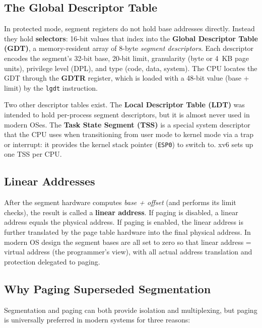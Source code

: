 \documentclass[11pt]{article}
\begin{document}
\subsection{The Global Descriptor Table}

In protected mode, segment registers do not hold base addresses directly. Instead they hold
\textbf{selectors}: 16-bit values that index into the \textbf{Global Descriptor Table
(GDT)}, a memory-resident array of 8-byte \emph{segment descriptors}. Each descriptor
encodes the segment's 32-bit base, 20-bit limit, granularity (byte or 4~KB page units),
privilege level (DPL), and type (code, data, system). The CPU locates the GDT through the
\textbf{GDTR} register, which is loaded with a 48-bit value (base + limit) by the
\texttt{lgdt} instruction.

Two other descriptor tables exist. The \textbf{Local Descriptor Table (LDT)} was intended
to hold per-process segment descriptors, but it is almost never used in modern OSes. The
\textbf{Task State Segment (TSS)} is a special system descriptor that the CPU uses when
transitioning from user mode to kernel mode via a trap or interrupt: it provides the kernel
stack pointer (\texttt{ESP0}) to switch to. xv6 sets up one TSS per CPU.

\subsection{Linear Addresses}

After the segment hardware computes \textit{base + offset} (and performs its limit checks),
the result is called a \textbf{linear address}. If paging is disabled, a linear address
equals the physical address. If paging is enabled, the linear address is further translated
by the page table hardware into the final physical address. In modern OS design the segment
bases are all set to zero so that linear address = virtual address (the programmer's view),
with all actual address translation and protection delegated to paging.

\subsection{Why Paging Superseded Segmentation}

Segmentation and paging can both provide isolation and multiplexing, but paging is
universally preferred in modern systems for three reasons:
\end{document}

